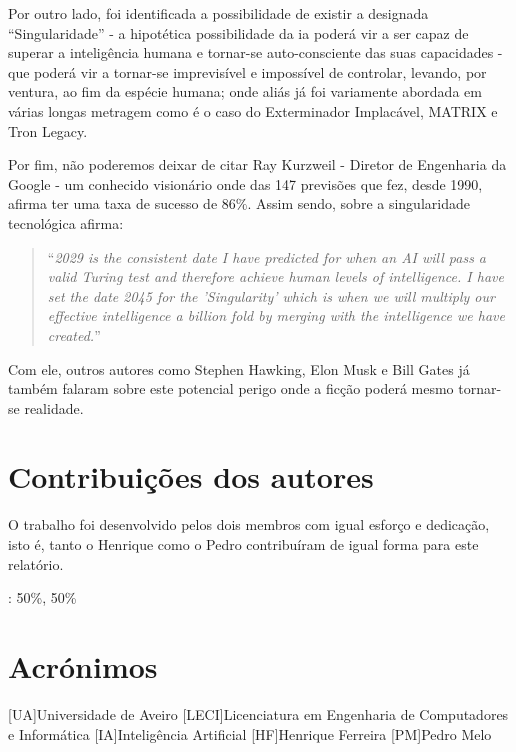\documentclass{report}
\begin{document}
Por outro lado, foi identificada a possibilidade de existir a designada ``Singularidade'' - a hipotética possibilidade da \ac{ia} poderá vir a ser capaz de superar a inteligência humana e tornar-se auto-consciente das suas capacidades - que poderá vir a tornar-se imprevisível e impossível de controlar, levando, por ventura, ao fim da espécie humana; onde aliás já foi
variamente abordada em várias longas metragem como é o caso do Exterminador Implacável, MATRIX e Tron Legacy.

Por fim, não poderemos deixar de citar Ray Kurzweil -  Diretor de Engenharia da Google - um conhecido visionário onde das 147 previsões que fez, desde 1990, afirma ter uma taxa de sucesso de $86\%$. Assim sendo, sobre a singularidade tecnológica afirma:

\begin{quote}
    ``\emph{2029 is the consistent date I have predicted for when an AI will pass a valid Turing test and therefore achieve human levels of intelligence. I have set the date 2045 for the 'Singularity' which is when we will multiply our effective intelligence a billion fold by merging with the intelligence we have created.}''~\cite{Kurzweil:2017}
\end{quote}

Com ele, outros autores como Stephen Hawking, Elon Musk e Bill Gates já também falaram sobre este potencial perigo onde a ficção poderá mesmo tornar-se realidade.



\chapter*{Contribuições dos autores}
O trabalho foi desenvolvido pelos dois membros com igual esforço e dedicação, isto é, tanto o \ac{Henrique} como o \ac{Pedro} contribuíram de igual forma para este relatório.

\vspace{10pt}

\autores : 50\%, 50\%
    
\chapter*{Acrónimos}
\begin{acronym}
[UA]{Universidade de Aveiro}
[LECI]{Licenciatura em Engenharia de Computadores e Informática}
[IA]{Inteligência Artificial}
[HF]{Henrique Ferreira}
[PM]{Pedro Melo}

\end{acronym}


\printbibliography
\end{document}
